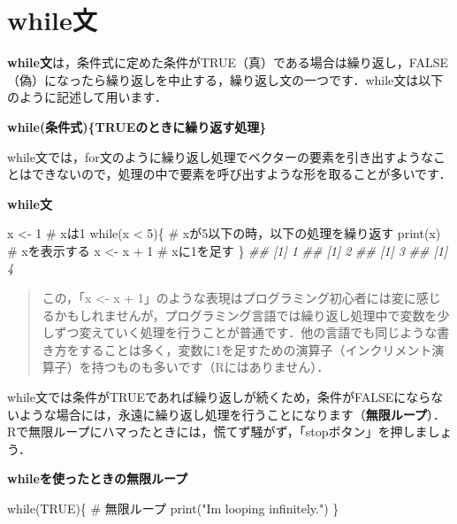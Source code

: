 \documentclass[
  letterpaper,
  DIV=11,
  numbers=noendperiod]{scrreprt}
\newenvironment{Shaded}{\begin{snugshade}}{\end{snugshade}}
\newcommand{\CommentTok}[1]{\textcolor[rgb]{0.37,0.37,0.37}{#1}}
\newcommand{\ConstantTok}[1]{\textcolor[rgb]{0.56,0.35,0.01}{#1}}
\newcommand{\ControlFlowTok}[1]{\textcolor[rgb]{0.00,0.23,0.31}{#1}}
\newcommand{\DecValTok}[1]{\textcolor[rgb]{0.68,0.00,0.00}{#1}}
\newcommand{\DocumentationTok}[1]{\textcolor[rgb]{0.37,0.37,0.37}{\textit{#1}}}
\newcommand{\FunctionTok}[1]{\textcolor[rgb]{0.28,0.35,0.67}{#1}}
\newcommand{\NormalTok}[1]{\textcolor[rgb]{0.00,0.23,0.31}{#1}}
\newcommand{\OtherTok}[1]{\textcolor[rgb]{0.00,0.23,0.31}{#1}}
\newcommand{\SpecialCharTok}[1]{\textcolor[rgb]{0.37,0.37,0.37}{#1}}
\newcommand{\StringTok}[1]{\textcolor[rgb]{0.13,0.47,0.30}{#1}}
\begin{document}
\hypertarget{whileux6587}{%
\section{while文}\label{whileux6587}}

\textbf{while文}は，条件式に定めた条件がTRUE（真）である場合は繰り返し，FALSE（偽）になったら繰り返しを中止する，繰り返し文の一つです．while文は以下のように記述して用います．

\textbf{while(条件式)\{TRUEのときに繰り返す処理\}}

while文では，for文のように繰り返し処理でベクターの要素を引き出すようなことはできないので，処理の中で要素を呼び出すような形を取ることが多いです．

\textbf{while文}

\begin{Shaded}
\begin{Highlighting}[]
\NormalTok{x }\OtherTok{\textless{}{-}} \DecValTok{1} \CommentTok{\# xは1}
\ControlFlowTok{while}\NormalTok{(x }\SpecialCharTok{\textless{}} \DecValTok{5}\NormalTok{)\{ }\CommentTok{\# xが5以下の時，以下の処理を繰り返す}
  \FunctionTok{print}\NormalTok{(x) }\CommentTok{\# xを表示する}
\NormalTok{  x }\OtherTok{\textless{}{-}}\NormalTok{ x }\SpecialCharTok{+} \DecValTok{1} \CommentTok{\# xに1を足す}
\NormalTok{\}}
\DocumentationTok{\#\# [1] 1}
\DocumentationTok{\#\# [1] 2}
\DocumentationTok{\#\# [1] 3}
\DocumentationTok{\#\# [1] 4}
\end{Highlighting}
\end{Shaded}

\begin{quote}
この，「x \textless- x +
1」のような表現はプログラミング初心者には変に感じるかもしれませんが，プログラミング言語では繰り返し処理中で変数を少しずつ変えていく処理を行うことが普通です．他の言語でも同じような書き方をすることは多く，変数に1を足すための演算子（インクリメント演算子）を持つものも多いです（Rにはありません）．
\end{quote}

while文では条件がTRUEであれば繰り返しが続くため，条件がFALSEにならないような場合には，永遠に繰り返し処理を行うことになります（\textbf{無限ループ}）．Rで無限ループにハマったときには，慌てず騒がず，「stopボタン」を押しましょう．

\textbf{whileを使ったときの無限ループ}

\begin{Shaded}
\begin{Highlighting}[]
\ControlFlowTok{while}\NormalTok{(}\ConstantTok{TRUE}\NormalTok{)\{ }\CommentTok{\# 無限ループ}
  \FunctionTok{print}\NormalTok{(}\StringTok{"I\textasciigrave{}m looping infinitely."}\NormalTok{)}
\NormalTok{\}}
\end{Highlighting}
\end{Shaded}
\end{document}
